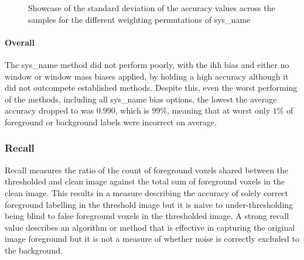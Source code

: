 \begin{figure}[h!]
    \centering
    \caption[Showcase of the standard deviation of the accuracy values across the samples for the different weighting permutations of AHT]{Showcase of the standard deviation of the accuracy values across the samples for the different weighting permutations of \gls{sys_name}}
    \label{fig:std_ihh_acc}
\end{figure}
\paragraph{Overall} 
The \gls{sys_name} method did not perform poorly, with the \gls{ihh} bias and either no window or window mass biases applied, by holding a high accuracy although it did not outcompete established methods. Despite this, even the worst performing of the methods, including all \gls{sys_name} bias options, the lowest the average accuracy dropped to was $0.990$, which is $99\%$, meaning that at worst only $1\%$ of foreground or background labels were incorrect on average. 

\subsubsection{Recall}
Recall measures the ratio of the count of foreground voxels shared between the thresholded and clean image against the total sum of foreground voxels in the clean image. This results in a measure describing the accuracy of solely correct foreground labelling in the threshold image but it is naive to under-thresholding being blind to false foreground voxels in the thresholded image. A strong recall value describes an algorithm or method that is effective in capturing the original image foreground but it is not a measure of whether noise is correctly excluded to the background.

